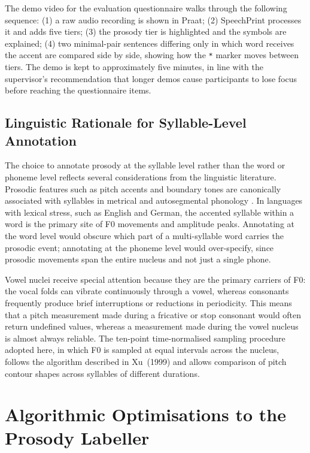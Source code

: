 The demo video for the evaluation questionnaire walks through the following
sequence: (1) a raw audio recording is shown in Praat; (2) SpeechPrint
processes it and adds five tiers; (3) the prosody tier is highlighted and the
symbols are explained; (4) two minimal-pair sentences differing only in which
word receives the accent are compared side by side, showing how the \texttt{*}
marker moves between tiers. The demo is kept to approximately five minutes, in
line with the supervisor's recommendation that longer demos cause participants
to lose focus before reaching the questionnaire items.

\subsection{Linguistic Rationale for Syllable-Level Annotation}
\label{sec:linguistic_rationale}

The choice to annotate prosody at the syllable level rather than the word or
phoneme level reflects several considerations from the linguistic literature.
Prosodic features such as pitch accents and boundary tones are canonically
associated with syllables in metrical and autosegmental phonology
\cite{ladd2008intonational, beckman2006tobi}. In languages with lexical stress,
such as English and German, the accented syllable within a word is the primary
site of F0 movements and amplitude peaks. Annotating at the word level would
obscure which part of a multi-syllable word carries the prosodic event; annotating
at the phoneme level would over-specify, since prosodic movements span the entire
nucleus and not just a single phone.

Vowel nuclei receive special attention because they are the primary carriers of
F0: the vocal folds can vibrate continuously through a vowel, whereas consonants
frequently produce brief interruptions or reductions in periodicity. This means
that a pitch measurement made during a fricative or stop consonant would often
return undefined values, whereas a measurement made during the vowel nucleus is
almost always reliable. The ten-point time-normalised sampling procedure adopted
here, in which F0 is sampled at equal intervals across the nucleus, follows the
algorithm described in Xu~(1999) \cite{xu1999} and allows comparison of pitch
contour shapes across syllables of different durations.

\section{Algorithmic Optimisations to the Prosody Labeller}
\label{sec:optimisations}

